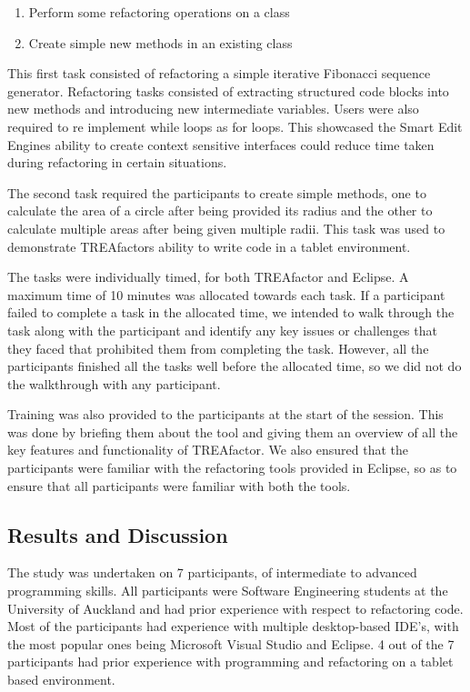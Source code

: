 \documentclass[10.5pt,twocolumn]{article}
\begin{document}
\begin{enumerate}
  \item Perform some refactoring operations on a class
  \item Create simple new methods in an existing class
\end{enumerate}

This first task consisted of refactoring a simple iterative Fibonacci sequence generator. Refactoring tasks consisted of extracting structured code blocks into new methods and introducing new intermediate variables.  Users were also required to re implement while loops as for loops. This showcased the Smart Edit Engines ability to create context sensitive interfaces could reduce time taken during refactoring in certain situations.


The second task required the participants to create simple methods, one to calculate the area of a circle after being provided its radius and the other to calculate multiple areas after being given multiple radii. This task was used to demonstrate TREAfactors ability to write code in a tablet environment.


The tasks were individually timed, for both TREAfactor and Eclipse. A maximum time of 10 minutes was allocated towards each task. If a participant failed to complete a task in the allocated time, we intended to walk through the task along with the participant and identify any key issues or challenges that they faced that prohibited them from completing the task. However, all the participants finished all the tasks well before the allocated time, so we did not do the walkthrough with any participant.

Training was also provided to the participants at the start of the session. This was done by briefing them about the tool and giving them an overview of all the key features and functionality of TREAfactor. We also ensured that the participants were familiar with the refactoring tools provided in Eclipse, so as to ensure that all participants were familiar with both the tools.

\subsection{Results and Discussion}
The study was undertaken on 7 participants, of intermediate to advanced programming skills. All participants were Software Engineering students at the University of Auckland and had prior experience with respect to refactoring code. Most of the participants had experience with multiple desktop-based IDE’s, with the most popular ones being Microsoft Visual Studio and Eclipse. 4 out of the 7 participants had prior experience with programming and refactoring on a tablet based environment.
\end{document}
